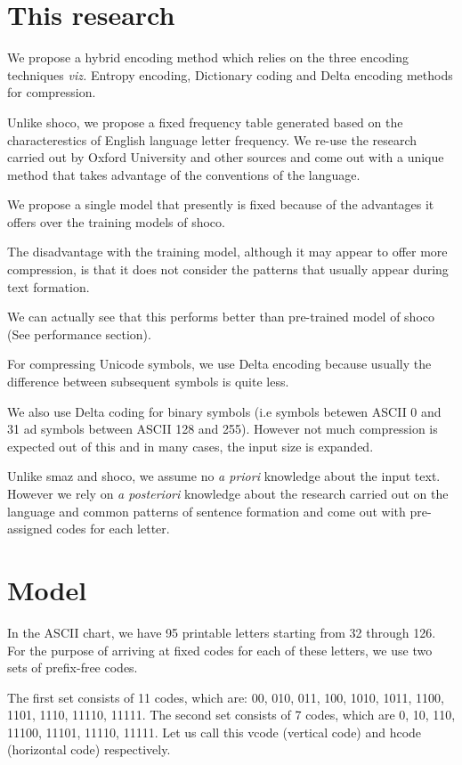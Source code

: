 \documentclass[]{article}
\begin{document}
\section{This research}

We propose a hybrid encoding method which relies on the three encoding techniques \emph{viz.} Entropy encoding, Dictionary coding and Delta encoding methods for compression.

Unlike shoco, we propose a fixed frequency table generated based on the characterestics of English language letter frequency.  We re-use the research carried out by Oxford University \cite{7} and other sources \cite{7} \cite{9} and come out with a unique method that takes advantage of the conventions of the language.

We propose a single model that presently is fixed because of the advantages it offers over the training models of shoco.

The disadvantage with the training model, although it may appear to offer more compression, is that it does not consider the patterns that usually appear during text formation.

We can actually see that this performs better than pre-trained model of shoco (See performance section).

For compressing Unicode symbols, we use Delta encoding because usually the difference between subsequent symbols is quite less.

We also use Delta coding for binary symbols (i.e symbols betewen ASCII 0 and 31 ad symbols between ASCII 128 and 255). However not much compression is expected out of this and in many cases, the input size is expanded.

Unlike smaz and shoco, we assume no \emph{a priori} knowledge about the input text.  However we rely on \emph{a posteriori} knowledge about the research carried out on the language and common patterns of sentence formation and come out with pre-assigned codes for each letter.

\section{Model}

In the ASCII chart, we have 95 printable letters starting from 32 through 126.  For the purpose of arriving at fixed codes for each of these letters, we use two sets of prefix-free codes.

The first set consists of 11 codes, which are: 00, 010, 011, 100, 1010, 1011, 1100, 1101, 1110, 11110, 11111.  The second set consists of 7 codes, which are 0, 10, 110, 11100, 11101, 11110, 11111.  Let us call this vcode (vertical code) and hcode (horizontal code) respectively.
\end{document}
